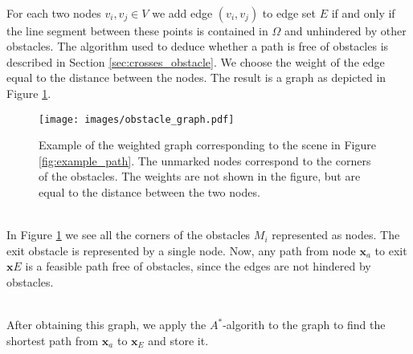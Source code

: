 \documentclass{article}
\renewcommand{\vec}[1]{\mathbf{#1}}
\begin{document}
\ \\
For each two nodes $v_i,v_j\in V$ we add edge $(v_i,v_j)$ to edge set $E$ if and only if the line segment between these points is contained in $\Omega$ and unhindered by other obstacles. The algorithm used to deduce whether a path is free of obstacles is described in Section \ref{sec:crosses_obstacle}. We choose the weight of the edge equal to the distance between the nodes. The result is a graph as depicted in Figure \ref{fig:example_graph}.
\begin{figure}[h]
	\centering
	\texttt{[image: images/obstacle\_graph.pdf]}
	\caption{Example of the weighted graph corresponding to the scene in Figure \ref{fig:example_path}. The unmarked nodes correspond to the corners of the obstacles. The weights are not shown in the figure, but are equal to the distance between the two nodes.}
	\label{fig:example_graph}
\end{figure}\\
In Figure \ref{fig:example_graph} we see all the corners of the obstacles $M_i$ represented as nodes. The exit obstacle is represented by a single node. Now, any path from node $\vec{x}_a$ to exit $\vec{x}E$ is a feasible path free of obstacles, since the edges are not hindered by obstacles.

\ \\
After obtaining this graph, we apply the $A^*$-algorith to the graph to find the shortest path from $\vec{x}_a$ to $\vec{x}_E$ and store it.
\newpage
\end{document}
